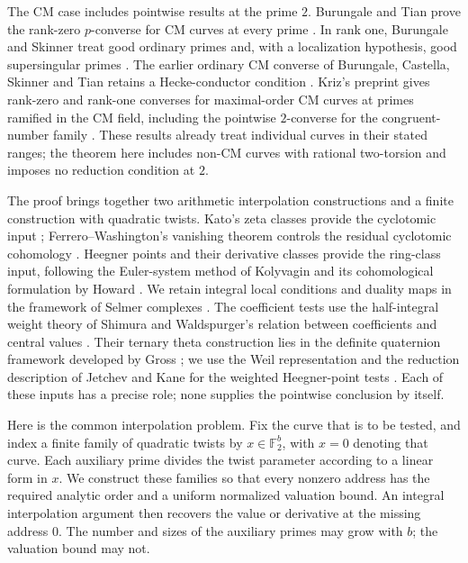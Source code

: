 The CM case includes pointwise results at the prime $2$.
Burungale and Tian prove the rank-zero $p$-converse for CM curves at
every prime \cite{BurungaleTian2026}. In rank one, Burungale and
Skinner treat good ordinary primes and, with a localization hypothesis,
good supersingular primes
\cite[Theorems~A.1 and~A.3, Remark~A.5]{BurungaleSkinner2024Appendix}.
The earlier ordinary CM converse of Burungale, Castella, Skinner and
Tian retains a Hecke-conductor condition
\cite{BurungaleCastellaSkinnerTian2022}.
Kriz's preprint gives rank-zero and rank-one converses for maximal-order
CM curves at primes ramified in the CM field, including the pointwise
$2$-converse for the congruent-number family
\cite[Theorems~1.1 and~10.17(2)]{Kriz2022CM}.
These results already treat individual curves in their stated ranges;
the theorem here includes non-CM curves with rational two-torsion and
imposes no reduction condition at $2$.

The proof brings together two arithmetic interpolation constructions and a
finite construction with quadratic twists.  Kato's zeta classes provide
the cyclotomic input \cite{Kato2004}; Ferrero--Washington's
vanishing theorem controls the residual cyclotomic cohomology
\cite{FerreroWashington1979}.  Heegner points and their derivative
classes provide the ring-class input, following the Euler-system method
of Kolyvagin and its cohomological formulation by Howard
\cite{Kolyvagin1990,Howard2012}.  We retain integral local conditions and
duality maps in the framework of Selmer complexes \cite{Nekovar2006}.
The coefficient tests use the half-integral weight theory of Shimura
and Waldspurger's relation between coefficients and central values
\cite{Shimura1973HalfIntegral,Waldspurger1981}.  Their ternary theta
construction lies in the definite quaternion framework developed by
Gross \cite{Gross1987Heights}; we use the Weil representation and the
reduction description of Jetchev and Kane for the weighted Heegner-point
tests \cite{Weil1964,JetchevKane2010}.
Each of these inputs has a precise role; none supplies the pointwise
conclusion by itself.

Here is the common interpolation problem.  Fix the curve that is to be
tested, and index a finite family of quadratic twists by
$x\in\mathbb F_2^b$, with $x=0$ denoting that curve.  Each auxiliary
prime divides the twist parameter according to a linear form in $x$.
We construct these families so that every nonzero address has the
required analytic order and a uniform normalized valuation bound.
An integral interpolation argument then recovers the value or derivative
at the missing address $0$.  The number and sizes of the auxiliary
primes may grow with $b$; the valuation bound may not.

